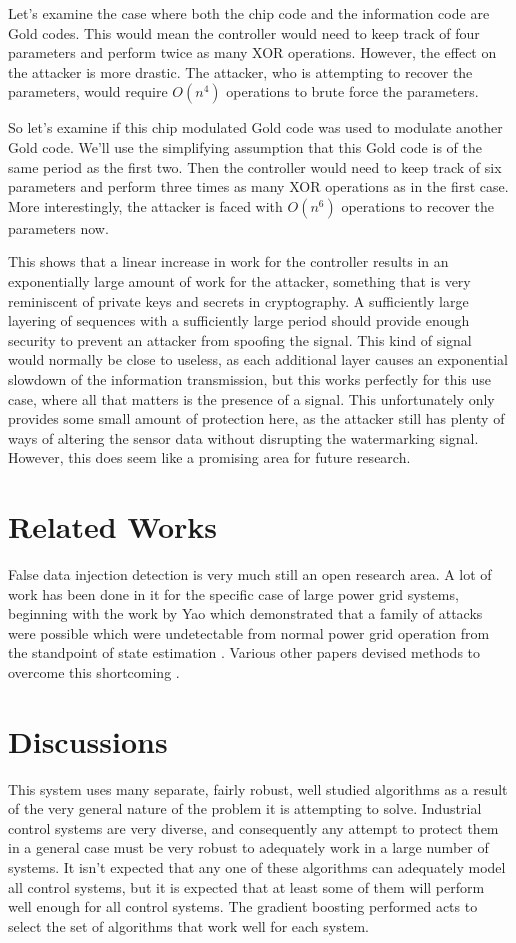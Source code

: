 \documentclass[10pt,twocolumn]{IEEEtran}
\begin{document}
Let's examine the case where both the chip code and the information code are Gold codes.
This would mean the controller would need to keep track of four parameters and perform twice as many XOR operations.
However, the effect on the attacker is more drastic.
The attacker, who is attempting to recover the parameters, would require $O(n^4)$ operations to brute force the parameters.

So let's examine if this chip modulated Gold code was used to modulate another Gold code.
We'll use the simplifying assumption that this Gold code is of the same period as the first two.
Then the controller would need to keep track of six parameters and perform three times as many XOR operations as in the first case.
More interestingly, the attacker is faced with $O(n^6)$ operations to recover the parameters now.

This shows that a linear increase in work for the controller results in an exponentially large amount of work for the attacker, something that is very reminiscent of private keys and secrets in cryptography.
A sufficiently large layering of sequences with a sufficiently large period should provide enough security to prevent an attacker from spoofing the signal.
This kind of signal would normally be close to useless, as each additional layer causes an exponential slowdown of the information transmission, but this works perfectly for this use case, where all that matters is the presence of a signal.
This unfortunately only provides some small amount of protection here, as the attacker still has plenty of ways of altering the sensor data without disrupting the watermarking signal.
However, this does seem like a promising area for future research.

\section{Related Works} \label{sec:related}
False data injection detection is very much still an open research area.
A lot of work has been done in it for the specific case of large power grid systems, beginning with the work by Yao which demonstrated that a family of attacks were possible which were undetectable from normal power grid operation from the standpoint of state estimation \cite{liu2011false}.
Various other papers devised methods to overcome this shortcoming \cite{bobba2010detecting}.

\section{Discussions}\label{sec:discussion}
This system uses many separate, fairly robust, well studied algorithms as a result of the very general nature of the problem it is attempting to solve.
Industrial control systems are very diverse, and consequently any attempt to protect them in a general case must be very robust to adequately work in a large number of systems.
It isn't expected that any one of these algorithms can adequately model all control systems, but it is expected that at least some of them will perform well enough for all control systems.
The gradient boosting performed acts to select the set of algorithms that work well for each system.
\end{document}
